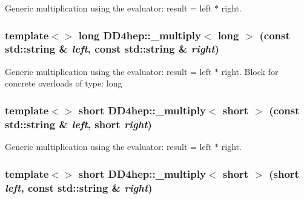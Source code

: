Generic multiplication using the evaluator: result = left $\ast$ right. \hypertarget{group___d_d4_h_e_p___g_e_o_m_e_t_r_y_gaafbe9fe15bbee4c4cdba40656afa20b1}{
\subsubsection[{\_\-multiply$<$ long $>$}]{\setlength{\rightskip}{0pt plus 5cm}template$<$$>$ long DD4hep::\_\-multiply$<$ long $>$ (const std::string \& {\em left}, \/  const std::string \& {\em right})}}
\label{group___d_d4_h_e_p___g_e_o_m_e_t_r_y_gaafbe9fe15bbee4c4cdba40656afa20b1}


Generic multiplication using the evaluator: result = left $\ast$ right. Block for concrete overloads of type: long \hypertarget{group___d_d4_h_e_p___g_e_o_m_e_t_r_y_ga4e0e6a70c55ef60889f83a8c18d86291}{
\subsubsection[{\_\-multiply$<$ short $>$}]{\setlength{\rightskip}{0pt plus 5cm}template$<$$>$ short DD4hep::\_\-multiply$<$ short $>$ (const std::string \& {\em left}, \/  short {\em right})}}
\label{group___d_d4_h_e_p___g_e_o_m_e_t_r_y_ga4e0e6a70c55ef60889f83a8c18d86291}


Generic multiplication using the evaluator: result = left $\ast$ right. \hypertarget{group___d_d4_h_e_p___g_e_o_m_e_t_r_y_gafec1086e2f2eb1e13a76d82673b16cad}{
\subsubsection[{\_\-multiply$<$ short $>$}]{\setlength{\rightskip}{0pt plus 5cm}template$<$$>$ short DD4hep::\_\-multiply$<$ short $>$ (short {\em left}, \/  const std::string \& {\em right})}}
\label{group___d_d4_h_e_p___g_e_o_m_e_t_r_y_gafec1086e2f2eb1e13a76d82673b16cad}


